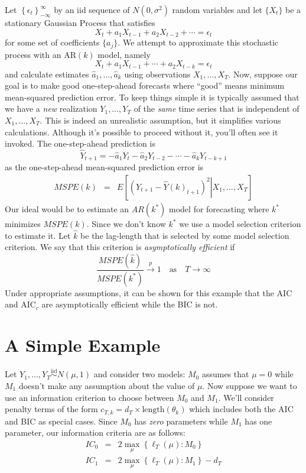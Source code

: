 Let $\left\{\epsilon_t\right\}_{-\infty}^{\infty}$ by an iid sequence of $N(0,\sigma^2)$ random variables and let $\{X_t\}$ be a stationary Gaussian Process that satisfies
$$X_t + a_1 X_{t-1} + a_2 X_{t-2} + \cdots  = \epsilon_t$$  
for some set of coefficients $\{a_j\}$. We attempt to approximate this stochastic process with an AR$(k)$ model, namely
$$X_t + a_1 X_{t-1} + \cdots + a_2 X_{t-k}  = \epsilon_t$$  
and calculate estimates $\widehat{a}_1, \hdots, \widehat{a}_k$ using observations $X_1, \hdots, X_T$. Now, suppose our goal is to make good one-step-ahead forecasts where ``good'' means minimum mean-squared prediction error. To keep things simple it is typically assumed that we have a \emph{new} realization $Y_1, \hdots, Y_T$ of the \emph{same} time series that is independent of $X_1, \hdots, X_T$. This is indeed an unrealistic assumption, but it simplifies various calculations. Although it's possible to proceed without it, you'll often see it invoked. The one-step-ahead prediction is
	$$\widehat{Y}_{t+1} = -\widehat{a}_1 Y_t - \widehat{a}_2 Y_{t-2} - \cdots - \widehat{a}_k Y_{t-k+1}$$
as the one-step-ahead mean-squared prediction error is
	\begin{eqnarray*}
		MSPE(k) &=& E\left[ \left(Y_{t+1} - \widehat{Y}(k)_{t+1}\right)^2\left. \right| X_1, \hdots, X_T\right]
	\end{eqnarray*}
Our ideal would be to estimate an $AR(k^*)$ model for forecasting where $k^*$ minimizes $MSPE(k)$. Since we don't know $k^*$ we use a model selection criterion to estimate it. Let $\widehat{k}$ be the lag-length that is selected by some model selection criterion. We say that this criterion is \emph{asymptotically efficient} if
	$$\frac{MSPE(\widehat{k})}{MSPE(k^*)}\overset{p}{\rightarrow} 1 \quad \mbox{as} \quad T \rightarrow \infty$$
Under appropriate assumptions, it can be shown for this example that the AIC and AIC$_c$ are asymptotically efficient while the BIC is not.




\section{A Simple Example}
Let $Y_1, \hdots, Y_T \overset{\mbox{iid}}{\sim} N(\mu,1)$ and consider two models: $M_0$ assumes that $\mu = 0$ while $M_1$ doesn't make any assumption about the value of $\mu$. Now suppose we want to use an information criterion to choose between $M_0$ and $M_1$. We'll consider penalty terms of the form $c_{T,k} = d_T 
\times \mbox{length}(\theta_k)$ which includes both the AIC and BIC as special cases. Since $M_0$ has \emph{zero} parameters while $M_1$ has one parameter, our information criteria are as follows:
	\begin{eqnarray*}
		IC_0 &=& 2 \max_\mu \left\{\ell_T(\mu)\colon M_0 \right\} \\
		IC_1 &=& 2 \max_\mu \left\{\ell_T(\mu)\colon M_1 \right\} - d_T
	\end{eqnarray*}

